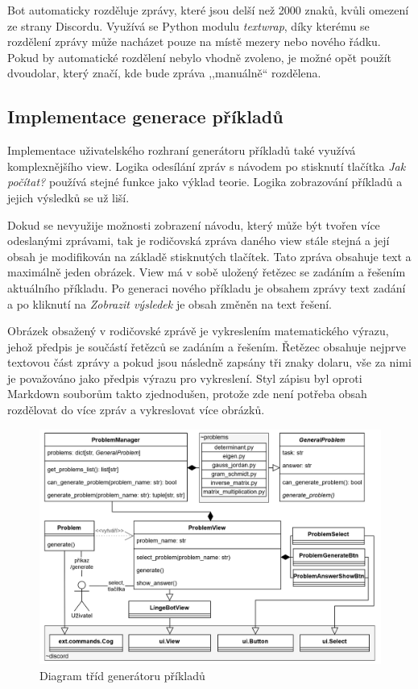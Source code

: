 \documentclass[FM]{tulthesis}
\begin{document}
	Bot automaticky rozděluje zprávy, které jsou delší než 2000 znaků, kvůli omezení ze strany Discordu. Využívá se Python modulu \textit{textwrap}, díky kterému se rozdělení zprávy může nacházet pouze na místě mezery nebo nového řádku. Pokud by automatické rozdělení nebylo vhodně zvoleno, je možné opět použít dvoudolar, který značí, kde bude zpráva ,,manuálně`` rozdělena.
	
	\subsection{Implementace generace příkladů}
	
	Implementace uživatelského rozhraní generátoru příkladů také využívá komplexnějšího view. Logika odesílání zpráv s návodem po stisknutí tlačítka \textit{Jak počítat?} používá stejné funkce jako výklad teorie. Logika zobrazování příkladů a jejich výsledků se už liší.
	
	Dokud se nevyužije možnosti zobrazení návodu, který může být tvořen více odeslanými zprávami, tak je rodičovská zpráva daného view stále stejná a její obsah je modifikován na základě stisknutých tlačítek. Tato zpráva obsahuje text a maximálně jeden obrázek. View má v sobě uložený řetězec se zadáním a řešením aktuálního příkladu. Po generaci nového příkladu je obsahem zprávy text zadání a po kliknutí na \textit{Zobrazit výsledek} je obsah změněn na text řešení.
	
	Obrázek obsažený v rodičovské zprávě je vykreslením matematického výrazu, jehož předpis je součástí řetězců se zadáním a řešením. Řetězec obsahuje nejprve textovou část zprávy a pokud jsou následně zapsány tři znaky dolaru, vše za nimi je považováno jako předpis výrazu pro vykreslení. Styl zápisu byl oproti \mbox{Markdown} souborům takto zjednodušen, protože zde není potřeba obsah rozdělovat do více zpráv a vykreslovat více obrázků.
	
	\begin{figure}[ht]
		\centering
		\includegraphics[width=\textwidth]{img/ProblemsDiagram}
		\caption{Diagram tříd generátoru příkladů}
		\label{_tag_img_problemuml}
	\end{figure}
	
\end{document}
